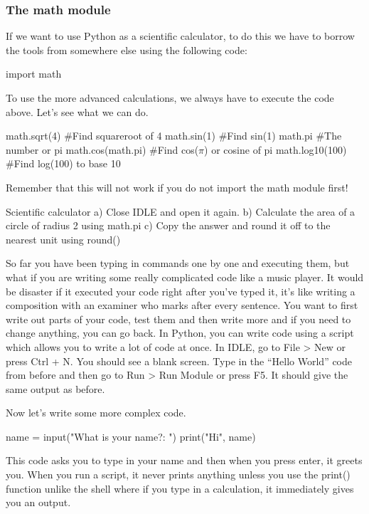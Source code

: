 \subsubsection{The math module}
If we want to use Python as a scientific calculator, to do this we have to borrow the tools from somewhere else using the following code:
\begin{shell}
 import math
 \end{shell}
 To use the more advanced calculations, we always have to execute the code above. Let’s see what we can do.
\begin{shell}
 math.sqrt(4) #Find squareroot of 4
 math.sin(1) 	#Find sin(1)
 math.pi #The number or pi
 math.cos(math.pi) 	#Find cos(\(\pi\)) or cosine of pi
 math.log10(100) 	#Find log(100) to base 10 
\end{shell}

Remember that this will not work if you do not import the math module first!
\begin{exercise} Scientific calculator
a) Close IDLE and open it again.
b) Calculate the area of a circle of radius 2 using math.pi
c) Copy the answer and round it off to the nearest unit using round()
\end{exercise}

So far you have been typing in commands one by one and executing them, but what if you are
writing some really complicated code like a music player. It would be disaster if it executed your
code right after you’ve typed it, it’s like writing a composition with an examiner who marks after
every sentence. You want to first write out parts of your code, test them and then write more and if you need to change anything, you can go back.
In Python, you can write code using a script which allows you to write a lot of code at once. In IDLE, go to File > New or press Ctrl + N. You should see a blank screen. Type in the “Hello World” code from before and then go to Run > Run Module or press F5. It should give the same output as before.

Now let’s write some more complex code.

\begin{script}
name = input("What is your name?: ")
print("Hi", name) 
\end{script}

This code asks you to type in your name and then when you press enter, it greets you. When you run a script, it never prints anything unless you use the print() function unlike the shell where if you type in a calculation, it immediately gives you an output.

